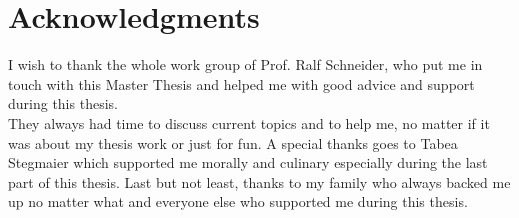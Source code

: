 \newpage

\chapter*{Acknowledgments}
I wish to thank the whole work group of Prof. Ralf Schneider, who put me in touch with this Master Thesis and helped me with good advice and support during this thesis.\\
They always had time to discuss current topics and to help me, no matter if it was about my thesis work or just for fun.
A special thanks goes to Tabea Stegmaier which supported me morally and culinary especially during the last part of this thesis. 
Last but not least, thanks to my family who always backed me up no matter what and everyone else who supported me during this thesis.

